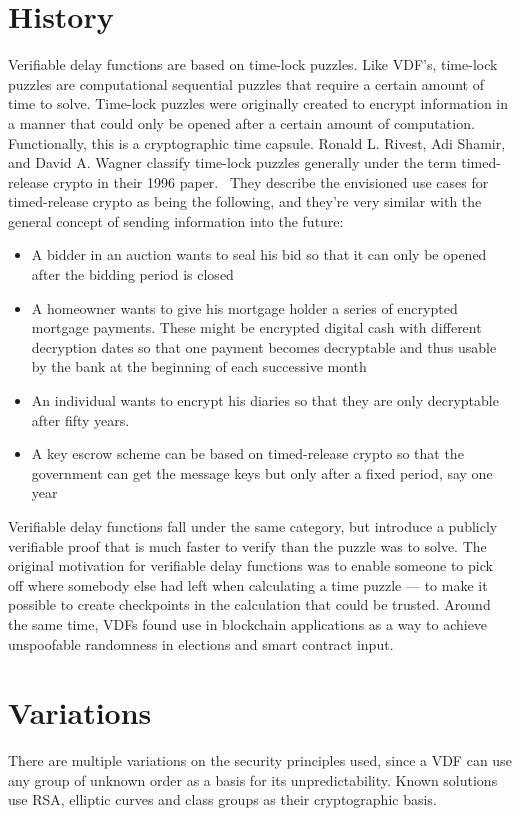 \section{History}
Verifiable delay functions are based on time-lock puzzles. Like VDF's, time-lock puzzles are computational sequential puzzles that require a certain amount of time to solve.\cite{Rivest_undated-qr} Time-lock puzzles were originally created to encrypt information in a manner that could only be opened after a certain amount of computation. Functionally, this is a cryptographic time capsule. Ronald L. Rivest, Adi Shamir, and David A. Wagner classify time-lock puzzles generally under the term timed-release crypto in their 1996 paper.~\cite{Rivest_undated-qr} They describe the envisioned use cases for timed-release crypto as being the following, and they're very similar with the general concept of sending information into the future:

\begin{itemize}
	\item A bidder in an auction wants to seal his bid so that it can only be opened after the bidding period is closed 
	\item A homeowner wants to give his mortgage holder a series of encrypted mortgage payments. These might be encrypted digital cash with different decryption dates so that one payment becomes decryptable and thus usable by the bank at the beginning of each successive month
	\item An individual wants to encrypt his diaries so that they are only decryptable after fifty years.
	\item A key escrow scheme can be based on timed-release crypto so that the government can get the message keys but only after a fixed period, say one year
\end{itemize}

Verifiable delay functions fall under the same category, but introduce a publicly verifiable proof that is much faster to verify than the puzzle was to solve. The original motivation for verifiable delay functions was to enable someone to pick off where somebody else had left when calculating a time puzzle --- to make it possible to create checkpoints in the calculation that could be trusted. Around the same time, VDFs found use in blockchain applications as a way to achieve unspoofable randomness in elections and smart contract input.

\section{Variations}
There are multiple variations on the security principles used, since a VDF can use any group of unknown order as a basis for its unpredictability. Known solutions use RSA, elliptic curves and class groups as their cryptographic basis.

